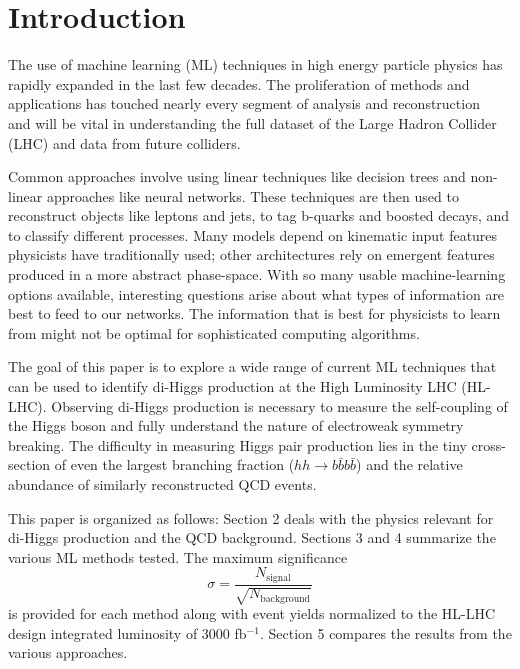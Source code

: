 \section{Introduction}
\label{sec:intro}

The use of machine learning (ML) techniques in high energy particle physics has rapidly expanded in the last few decades. The proliferation of methods and applications has touched nearly every segment of analysis and reconstruction~\cite{albertsson2018machine} and will be vital in understanding the full dataset of the Large Hadron Collider (LHC) and data from future colliders.

Common approaches involve using linear techniques like decision trees and non-linear approaches like neural networks. These techniques are then used to reconstruct objects like leptons and jets, to tag b-quarks and boosted decays, and to classify different processes. Many models depend on kinematic input features physicists have traditionally used; other architectures rely on emergent features produced in a more abstract phase-space. With so many usable machine-learning options available, interesting questions arise about what types of information are best to feed to our networks. The information that is best for physicists to learn from might not be optimal for sophisticated computing algorithms.

The goal of this paper is to explore a wide range of current ML techniques that can be used to identify di-Higgs production at the High Luminosity LHC (HL-LHC). Observing di-Higgs production is necessary to measure the self-coupling of the Higgs boson and fully understand the nature of electroweak symmetry breaking. The difficulty in measuring Higgs pair production lies in the tiny cross-section of even the largest branching fraction ($hh\rightarrow b\bar{b}b\bar{b}$) and the relative abundance of similarly reconstructed QCD events.

This paper is organized as follows: Section 2 deals with the physics relevant for di-Higgs production and the QCD background. Sections 3 and 4 summarize the various ML methods tested. The maximum significance
\begin{equation}
  \sigma = \frac{N_{\textrm{signal}}}{\sqrt{N_{\textrm{background}}}}
\end{equation}
is provided for each method along with event yields normalized to the HL-LHC design integrated luminosity of 3000 fb$^{-1}$. Section 5 compares the results from the various approaches.
